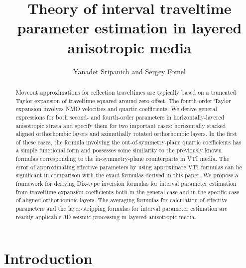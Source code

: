 
\title{Theory of interval traveltime parameter estimation in layered anisotropic media}
\author{Yanadet Sripanich and Sergey Fomel}

\address{
Bureau of Economic Geology \\
John A. and Katherine G. Jackson School of Geosciences \\
The University of Texas at Austin \\
University Station, Box X \\
Austin, TX 78713-8924 
}
\maketitle


\begin{abstract}
Moveout approximations for reflection traveltimes are typically based on a truncated Taylor expansion of traveltime squared around zero offset. The fourth-order Taylor expansion involves NMO velocities and quartic coefficients. We derive general expressions for  both second- and fourth-order parameters in horizontally-layered anisotropic strata and specify them for two important cases: horizontally stacked aligned orthorhombic layers and azimuthally rotated orthorhombic layers. In the first of these cases, the formula involving the out-of-symmetry-plane quartic coefficients has a simple functional form and possesses some similarity to the previously known formulas corresponding to the  in-symmetry-plane counterparts in VTI media. The error of approximating effective parameters by using approximate VTI formulas can be significant in comparison with the exact formulas derived in this paper. We propose a framework for deriving Dix-type inversion formulas for interval parameter estimation from traveltime expansion coefficients both in the general case and in the specific case of aligned orthorhombic layers. The averaging formulas for calculation of effective parameters and the layer-stripping formulas for interval parameter estimation are readily applicable  3D seismic  processing in layered anisotropic media.
\end{abstract}

\section{Introduction}


